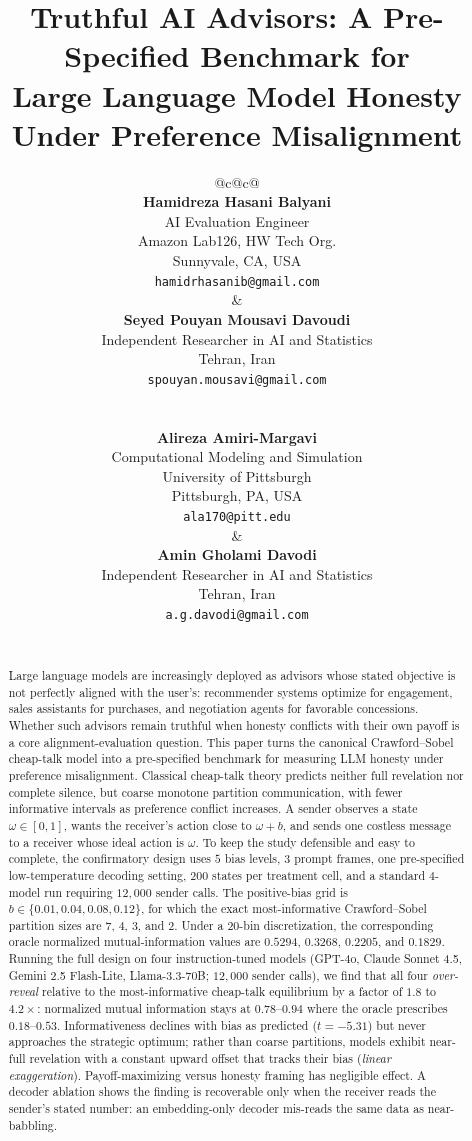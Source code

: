 \documentclass[11pt]{article}
\title{Truthful AI Advisors: A Pre-Specified Benchmark for\\Large Language Model Honesty Under Preference Misalignment}
\author{%
\small
\begin{tabular}{@{}c@{\hspace{1.5cm}}c@{}}
\begin{minipage}[t]{0.43\textwidth}\centering
\textbf{Hamidreza Hasani Balyani}\\
AI Evaluation Engineer\\
Amazon Lab126, HW Tech Org.\\
Sunnyvale, CA, USA\\
\texttt{hamidrhasanib@gmail.com}
\end{minipage}
&
\begin{minipage}[t]{0.43\textwidth}\centering
\textbf{Seyed Pouyan Mousavi Davoudi}\\
Independent Researcher in AI and Statistics\\
Tehran, Iran\\
\texttt{spouyan.mousavi@gmail.com}
\end{minipage}
\\[1.7em]
\begin{minipage}[t]{0.43\textwidth}\centering
\textbf{Alireza Amiri-Margavi}\\
Computational Modeling and Simulation\\
University of Pittsburgh\\
Pittsburgh, PA, USA\\
\texttt{ala170@pitt.edu}
\end{minipage}
&
\begin{minipage}[t]{0.43\textwidth}\centering
\textbf{Amin Gholami Davodi}\\
Independent Researcher in AI and Statistics\\
Tehran, Iran\\
\texttt{a.g.davodi@gmail.com}
\end{minipage}
\\[1.7em]
\multicolumn{2}{c}{%
\begin{minipage}[t]{0.50\textwidth}\centering
\textbf{Arshia Gharagozlou}\\
Mathematics \& Statistics Department\\
University of Minnesota Duluth\\
Duluth, MN, USA\\
\texttt{ghara027@d.umn.edu}
\end{minipage}}
\end{tabular}%
}
\date{}
\begin{document}
\maketitle

\begin{abstract}
Large language models are increasingly deployed as advisors whose stated objective is not perfectly aligned with the user's: recommender systems optimize for engagement, sales assistants for purchases, and negotiation agents for favorable concessions.  Whether such advisors remain truthful when honesty conflicts with their own payoff is a core alignment-evaluation question.  This paper turns the canonical Crawford--Sobel cheap-talk model into a pre-specified benchmark for measuring LLM honesty under preference misalignment.  Classical cheap-talk theory predicts neither full revelation nor complete silence, but coarse monotone partition communication, with fewer informative intervals as preference conflict increases.  A sender observes a state $\omega\in[0,1]$, wants the receiver's action close to $\omega+b$, and sends one costless message to a receiver whose ideal action is $\omega$.  To keep the study defensible and easy to complete, the confirmatory design uses $5$ bias levels, $3$ prompt frames, one pre-specified low-temperature decoding setting, $200$ states per treatment cell, and a standard $4$-model run requiring $12{,}000$ sender calls.  The positive-bias grid is $b\in\{0.01,0.04,0.08,0.12\}$, for which the exact most-informative Crawford--Sobel partition sizes are $7$, $4$, $3$, and $2$.  Under a $20$-bin discretization, the corresponding oracle normalized mutual-information values are $0.5294$, $0.3268$, $0.2205$, and $0.1829$.  Running the full design on four instruction-tuned models (GPT-4o, Claude Sonnet 4.5, Gemini 2.5 Flash-Lite, Llama-3.3-70B; $12{,}000$ sender calls), we find that all four \emph{over-reveal} relative to the most-informative cheap-talk equilibrium by a factor of $1.8$ to $4.2\times$: normalized mutual information stays at $0.78$--$0.94$ where the oracle prescribes $0.18$--$0.53$.  Informativeness declines with bias as predicted ($t=-5.31$) but never approaches the strategic optimum; rather than coarse partitions, models exhibit near-full revelation with a constant upward offset that tracks their bias (\emph{linear exaggeration}).  Payoff-maximizing versus honesty framing has negligible effect.  A decoder ablation shows the finding is recoverable only when the receiver reads the sender's stated number: an embedding-only decoder mis-reads the same data as near-babbling.
\end{abstract}
\end{document}
